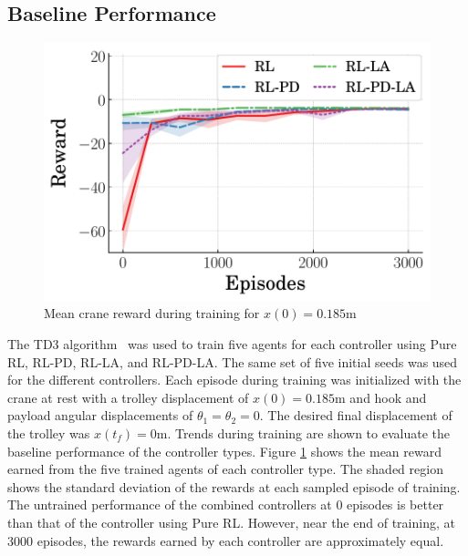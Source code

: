 \subsection{Baseline Performance}
%
\begin{figure}[tb]
        \centering
        \includegraphics[width=0.65\columnwidth]{figures/figures_RL_model_based_control/dpcrane_mean_reward_v_episode.pdf}
        \vspace{-2ex}
        \caption{Mean crane reward during training for $x(0)=0.185\si{\meter}$}
        \label{fig:dpcrane_mean_reward_baseline}
\end{figure}
%
The TD3 algorithm~\cite{Fujimoto:2018a} was used to train five agents for each controller using Pure RL, RL-PD, RL-LA, and RL-PD-LA. The same set of five initial seeds was used for the different controllers. Each episode during training was initialized with the crane at rest with a trolley displacement of $x(0)=0.185\si{\meter}$ and hook and payload angular displacements of $\theta_1=\theta_2=0$. The desired final displacement of the trolley was $x(t_f)=0\si{\meter}$. Trends during training are shown to evaluate the baseline performance of the controller types. Figure \ref{fig:dpcrane_mean_reward_baseline} shows the mean reward earned from the five trained agents of each controller type. The shaded region shows the standard deviation of the rewards at each sampled episode of training. The untrained performance of the combined controllers at 0 episodes is better than that of the controller using Pure RL. However, near the end of training, at 3000 episodes, the rewards earned by each controller are approximately equal.
%

